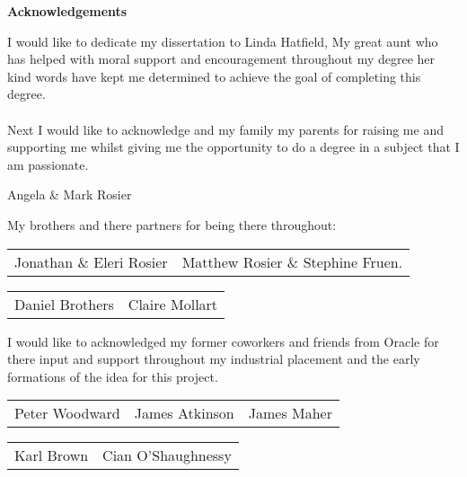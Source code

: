 \thispagestyle{empty}

\begin{center}
    {\LARGE\bf Acknowledgements}
\end{center}
I would like to dedicate my dissertation to Linda Hatfield, My great aunt who has helped with moral support and encouragement throughout my degree her kind words have kept me determined to achieve the goal of completing this degree.\\
\\
Next I would like to acknowledge and my family my parents for raising me and supporting me whilst giving me the opportunity to do a degree in a subject that I am passionate.
\begin{center}
Angela \& Mark Rosier
\end{center}

\noindent
My brothers and there partners for being there throughout:

\begin{center}
\begin{tabular}{ l r }
Jonathan \& Eleri Rosier & Matthew Rosier \& Stephine Fruen.\\
\end{tabular}
\end{center}

\begin{center}
\begin{tabular}{ l r }
Daniel Brothers & Claire Mollart\\
\end{tabular}
\end{center}

\noindent
I would like to acknowledged my former coworkers and friends from Oracle for there input and support throughout my industrial placement and the early formations of the idea for this project.

\begin{center}
\begin{tabular}{ l c r }
Peter Woodward & James Atkinson & James Maher\\
\end{tabular}
\end{center}

\begin{center}
\begin{tabular}{ l r }
Karl Brown & Cian O'Shaughnessy\\
\end{tabular}
\end{center}

